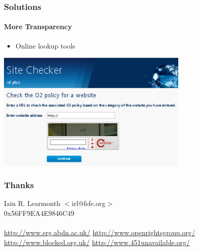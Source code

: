 \documentclass{beamer}
\begin{document}
\begin{frame}
	\frametitle{Solutions}
	\framesubtitle{More Transparency}
	\begin{itemize}
		\item{Online lookup tools}
	\end{itemize}
	\begin{center}
		\includegraphics[width=0.7\textwidth]{o2checker.png}
	\end{center}
\end{frame}

\begin{frame}
	\frametitle{Thanks}
	\begin{center}
		{\LARGE Iain R. Learmonth $<$irl@fsfe.org$>$ \\ 0x56FF9EA4E9846C49}
		\ \\ \ \\
		{\LARGE \url{http://www.erg.abdn.ac.uk/}}
		{\LARGE \url{http://www.openrightsgroup.org/}}
		{\LARGE \url{http://www.blocked.org.uk/}}
		{\LARGE \url{http://www.451unavailable.org/}}
	\end{center}
\end{frame}
\end{document}
